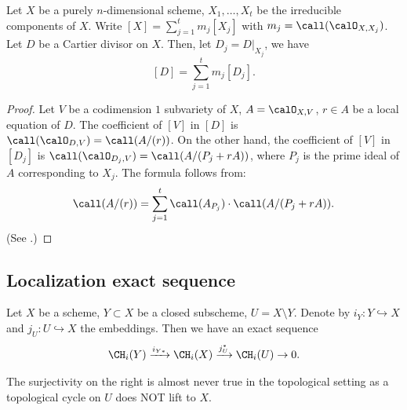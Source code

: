     \begin{lemma}\label{lem:restriction_of_cartier_divisor_to_irreducible_components}
        Let \(X\) be a purely \(n\)-dimensional scheme, \(X_1, \ldots, X_t\) be the irreducible components of \(X\).
        Write \([X] = \sum_{j=1}^t m_j [X_j]\) with \(m_j = \call(\calO_{X,X_j})\).
        Let \(D\) be a Cartier divisor on \(X\).
        Then, let \(D_j = D|_{X_j}\),
        we have
        \[ [D] = \sum_{j=1}^t m_j [D_j]. \]
    \end{lemma}
    \begin{proof}
        Let \(V\) be a codimension \(1\) subvariety of \(X\), \(A = \calO_{X,V}\), \(r \in A\) be a local equation of \(D\).
        The coefficient of \([V]\) in \([D]\) is \(\call(\calO_{D,V}) = \call(A/(r))\).
        On the other hand, the coefficient of \([V]\) in \([D_j]\) is \(\call(\calO_{D_j,V}) = \call(A/(P_j+rA))\), where \(P_j\) is the prime ideal of \(A\) corresponding to \(X_j\).
        The formula follows from:
        \begin{align*}
            \call(A/(r)) = \sum_{j=1}^t \call(A_{P_j}) \cdot \call(A/(P_j+rA)).
        \end{align*}
        (See \cite[A.2.7]{Fulton13Intersection}.)
    \end{proof}

\subsection{Localization exact sequence}

    \begin{proposition}
        Let \(X\) be a scheme, \(Y \subset X\) be a closed subscheme, \(U = X \setminus Y\).
        Denote by \(i_Y : Y \hookrightarrow X\) and \(j_U : U \hookrightarrow X\) the embeddings.
        Then we have an exact sequence
        \[ \CH_i(Y) \xrightarrow{i_{Y*}} \CH_i(X) \xrightarrow{j_U^*} \CH_i(U) \to 0. \]
    \end{proposition}

    \begin{remark}
        The surjectivity on the right is almost never true in the topological setting as a topological cycle on \(U\) does NOT lift to \(X\).
    \end{remark}

